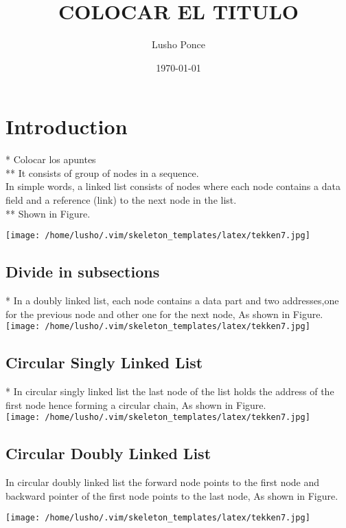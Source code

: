 \documentclass{article}
\title{COLOCAR EL TITULO}
\author{Lusho Ponce}
\date{\today}
\begin{document}
\maketitle

\section{Introduction}
* Colocar los apuntes \\ 
** It consists of group of nodes in a sequence.\\
In simple words, a linked list consists of nodes where each node contains a data field and a reference (link) to the next node in the list.\\
** Shown in Figure.  

\texttt{[image: /home/lusho/.vim/skeleton\_templates/latex/tekken7.jpg]}
\subsection{Divide in subsections}
* In a doubly linked list, each node contains a data part
and two addresses,one for the previous node and other one for the next node, As shown in Figure.\\
\texttt{[image: /home/lusho/.vim/skeleton\_templates/latex/tekken7.jpg]}
\subsection{ Circular Singly Linked List}
* In circular singly linked list the last node of the list holds the address of the first node hence forming a circular chain, As shown in Figure.\\
\texttt{[image: /home/lusho/.vim/skeleton\_templates/latex/tekken7.jpg]}

\subsection{ Circular Doubly Linked List}
In circular doubly linked list the forward node points to the first node and backward pointer of the first node points to the last node, As shown in Figure.


\texttt{[image: /home/lusho/.vim/skeleton\_templates/latex/tekken7.jpg]}
\end{document}
